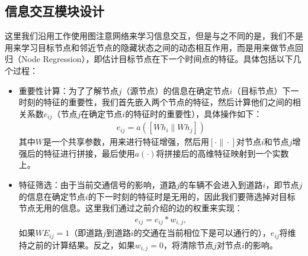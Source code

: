 \subsection{信息交互模块设计}
这里我们沿用工作使用图注意网络来学习信息交互，但是与之不同的是，我们不是用来学习目标节点和邻近节点的隐藏状态之间的动态相互作用，而是用来做节点回归（Node Regression），即估计目标节点在下一个时间点的特征。具体包括以下几个过程：
\begin{itemize}
  \item 重要性计算：为了了解节点$j$（源节点）的信息在确定节点$i$（目标节点）下一时刻的特征的重要性，我们首先嵌入两个节点的特征，然后计算他们之间的相关系数$e_{i j}$（节点$j$在确定节点$i$的特征时的重要性），具体操作如下：
  \begin{align}
    e_{i j}=a\left(\left[W h_{i} \| W h_{j}\right]\right)
  \end{align}
  其中$W$是一个共享参数，用来进行特征增强，然后用$[\cdot \| \cdot]$对节点$i$和节点$j$增强后的特征进行拼接，最后使用$a(\cdot)$将拼接后的高维特征映射到一个实数上。
  
  \item 特征筛选：由于当前交通信号的影响，道路$j$的车辆不会进入到道路$i$，即节点$j$的信息在确定节点$i$的下一时刻的特征时是无用的，因此我们要筛选掉对目标节点无用的信息。这里我们通过之前介绍的边的权重来实现：
  \begin{align}
    \label{eq:mul_phase}
    e_{i j} = e_{i j} * w_{i,j},
  \end{align}
  如果$WE_{i j} = 1$（即道路$j$到道路$i$的交通在当前相位下是可以通行的），$e_{ij}$将维持之前的计算结果。反之，如果$w_{i,j}=0$，将清除节点$j$对节点$i$的影响。
  

\end{itemize}
